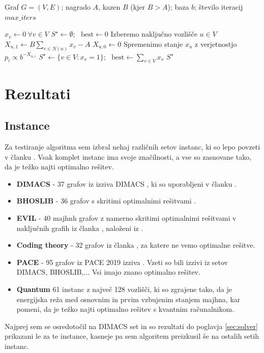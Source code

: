 \documentclass[slovenian, 10pt, titlepage, a4paper]{article}
\begin{document}
\begin{algorithmic}[1]
\Require Graf $G = (V,E)$; nagrado $A$, kazen $B$ (kjer $B > A$); baza $b$; število iteracij $max\_iters$

\State $x_v \gets 0 \ \forall v \in V$ 
\State $S^\star \gets \emptyset$; \ $\mathrm{best} \gets 0$
    \State Izberemo naključno vozlišče $u \in V$
    \State $X_{u,1} \gets B \sum_{v \in N(u)} x_v - A$
    \State $X_{u,0} \gets 0$
    \State Spremenimo stanje $x_u$ z verjetnostjo $p_{i} \propto b^{-X_{u,i}}$
        \State $S^\star \gets \{v \in V : x_v = 1\}$; \ $\mathrm{best} \gets \sum_{v \in V} x_v$
    \EndIf
\EndFor
\State \Return $S^\star$
\end{algorithmic}


\newpage
\section{Rezultati}
    \subsection{Instance}
    Za testiranje algoritma sem izbral nehaj različnih setov instanc, ki so lepo povzeti v članku \cite{Marino_2026}.
    Vsak komplet instanc ima svoje značilnosti, a vse so zasnovane tako, da je težko najti optimalno rešitev.
    \begin{itemize}
        \item \textbf{DIMACS} - 37 grafov iz izziva DIMACS \cite{dimacs1996}, ki so uporabljeni v članku \cite{Krpan_2025}.
        \item \textbf{BHOSLIB} - 36 grafov s skritimi optimalnimi rešitvami \cite{bhoslib}.
        \item \textbf{EVIL} - 40 majhnh grafov z namerno skritimi optimalnimi rešitvami v naključnih grafih iz članka \cite{szabo2019evil}, naloženi iz \cite{evil2repo}.
        \item \textbf{Coding theory} -  32 grafov iz članka \cite{sloane2000challenge}, za katere ne vemo optimalne rešitve.
        \item \textbf{PACE} - 95 grafov iz PACE 2019 izziva \cite{pace2019}. Vzeti so bili izzivi iz setov DIMACS, BHOSLIB,... Vsi imajo znano optimalno rešitev. \cite{pace2019instances}
        \item \textbf{Quantum} 61 instanc z največ 128 vozlišči, ki so zgrajene tako, da je energijska reža med osnovnim in prvim vzbujenim stanjem majhna, kar pomeni, da je težko najti optimalno rešitev s kvantnim računalnikom. \cite{qbenchmarks}
    \end{itemize}
    Najprej sem se osredotočil na DIMACS set in so rezultati do poglavja \ref{sec:solver} prikazani le za te instance, kasneje pa sem algoritem preizkusil še na ostalih setih instanc.
\end{document}
